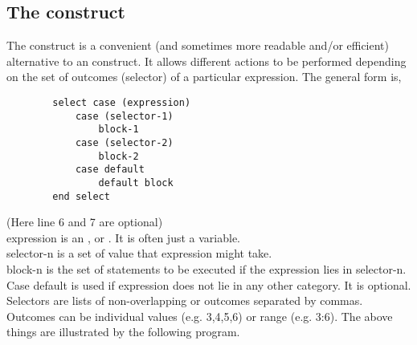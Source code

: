 \documentclass[class=book,crop=false]{standalone}
\begin{document}
    \subsection{The  construct}
    The  construct is a convenient (and sometimes more readable and/or efficient) alternative to an  construct.
    It allows different actions to be performed depending on the set of outcomes (selector) of a particular expression. 
    The general form is,
    \begin{lstlisting}
        select case (expression)
            case (selector-1)
                block-1
            case (selector-2)
                block-2
            case default
                default block
        end select
    \end{lstlisting}
    (Here line 6 and 7 are optional)\\
    expression is an ,  or . It is often just a variable.\\
    selector-n is a set of value that expression might take.\\
    block-n is the set of statements to be executed if the expression lies in selector-n.\\
    Case default is used if expression does not lie in any other category. It is optional.\\
    Selectors are lists of non-overlapping  or  outcomes separated by commas. Outcomes can be individual values (e.g. 3,4,5,6) or range (e.g. 3:6).
    The above things are illustrated by the following program.
    
    
\end{document}
